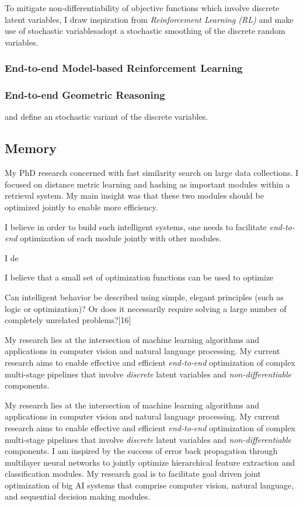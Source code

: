\documentclass[a4paper, 10pt]{article}
\begin{document}
To mitigate non-differentiability of objective functions which involve
discrete latent variables, I draw inspiration from {\em Reinforcement
  Learning (RL)} and make use of stochastic variablesadopt a stochastic smoothing of the discrete
random variables.

\subsubsection*{End-to-end Model-based Reinforcement Learning}
\subsubsection*{End-to-end Geometric Reasoning}


and define an stochastic variant of the
discrete variables.

\subsection{Memory}

My PhD research concerned with fast similarity search on large data
collections. I focused on distance metric learning and hashing as
important modules within a retrieval system. My main insight was that
these two modules should be optimized jointly to enable more efficiency.


I believe in order to build such intelligent systems,
one needs to facilitate {\em end-to-end} optimization of each module
jointly with other modules.



I de

I believe that a small
set of optimization functions can be used to optimize 


Can intelligent behavior be described using simple, elegant principles
(such as logic or optimization)? Or does it necessarily require
solving a large number of completely unrelated problems?[16]



My research lies at the intersection of machine learning algorithms
and applications in computer vision and natural language processing.
My current research aims to enable effective and efficient {\em
  end-to-end} optimization of complex multi-stage pipelines that
involve {\em discrete} latent variables and {\em non-differentiable}
components. 


My research lies at the intersection of machine learning algorithms
and applications in computer vision and natural language processing.
My current research aims to enable effective and efficient {\em
  end-to-end} optimization of complex multi-stage pipelines that
involve {\em discrete} latent variables and {\em non-differentiable}
components.  I am inspired by the success of error back propagation
through multilayer neural networks to jointly optimize hierarchical
feature extraction and classification modules. My research goal is to
facilitate goal driven joint optimization of big AI systems that
comprise computer vision, natural language, and sequential decision
making modules.
\end{document}
